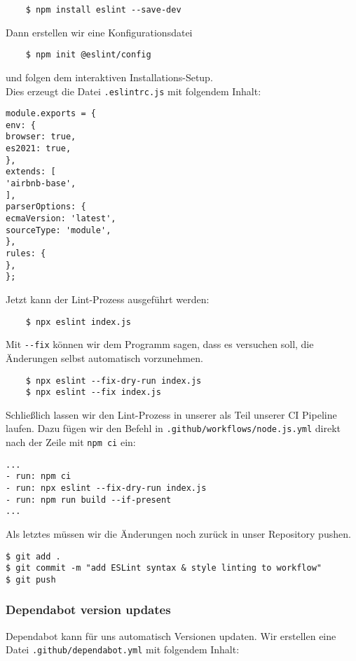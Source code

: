 \begin{verbatim}
	$ npm install eslint --save-dev
\end{verbatim}

\noindent
Dann erstellen wir eine Konfigurationsdatei

\begin{verbatim}
	$ npm init @eslint/config
\end{verbatim}

\noindent
und folgen dem interaktiven Installations-Setup. \\

\noindent
Dies erzeugt die Datei \verb|.eslintrc.js| mit folgendem Inhalt:

\begin{verbatim}
module.exports = {
env: {
browser: true,
es2021: true,
},
extends: [
'airbnb-base',
],
parserOptions: {
ecmaVersion: 'latest',
sourceType: 'module',
},
rules: {
},
};
\end{verbatim}

\noindent
Jetzt kann der Lint-Prozess ausgeführt werden:

\begin{verbatim}
	$ npx eslint index.js
\end{verbatim}

\noindent
Mit \verb|--fix| können wir dem Programm sagen,
dass es versuchen soll, die Änderungen selbst
automatisch vorzunehmen.

\begin{verbatim}
	$ npx eslint --fix-dry-run index.js
	$ npx eslint --fix index.js
\end{verbatim}

\noindent
Schließlich lassen wir den Lint-Prozess in unserer
als Teil unserer CI Pipeline laufen.
Dazu fügen wir den Befehl in \verb|.github/workflows/node.js.yml|
direkt nach der Zeile mit \verb|npm ci| ein:

\begin{verbatim}
...
- run: npm ci
- run: npx eslint --fix-dry-run index.js
- run: npm run build --if-present
...
\end{verbatim}

\noindent
Als letztes müssen wir die Änderungen noch zurück in unser
Repository pushen.

\begin{verbatim}
$ git add .
$ git commit -m "add ESLint syntax & style linting to workflow"
$ git push
\end{verbatim}


\subsubsection{Dependabot version updates}
Dependabot kann für uns automatisch Versionen updaten.
Wir erstellen eine Datei \verb|.github/dependabot.yml| 
mit folgendem Inhalt:

